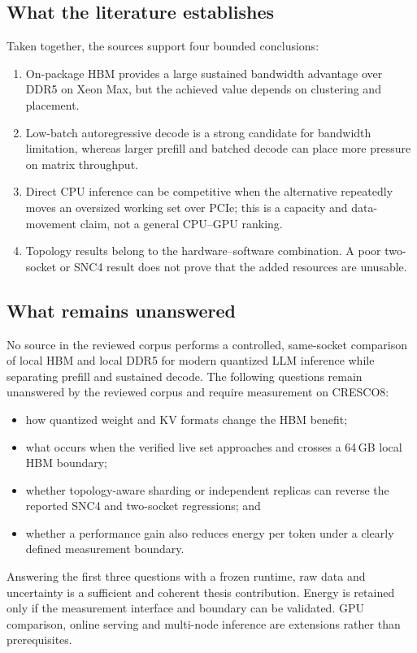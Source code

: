 \subsection{What the literature establishes}

Taken together, the sources support four bounded conclusions:

\begin{enumerate}
  \item On-package HBM provides a large sustained bandwidth advantage
        over DDR5 on Xeon Max, but the achieved value depends on
        clustering and placement.
  \item Low-batch autoregressive decode is a strong candidate for
        bandwidth limitation, whereas larger prefill and batched decode
        can place more pressure on matrix throughput.
  \item Direct CPU inference can be competitive when the alternative
        repeatedly moves an oversized working set over PCIe; this is a
        capacity and data-movement claim, not a general CPU--GPU ranking.
  \item Topology results belong to the hardware--software combination.
        A poor two-socket or SNC4 result does not prove that the added
        resources are unusable.
\end{enumerate}

\subsection{What remains unanswered}
\label{sec:research-gap}

No source in the reviewed corpus performs a controlled, same-socket
comparison of local HBM and local DDR5 for modern quantized LLM
inference while separating prefill and sustained decode.  The following
questions remain unanswered by the reviewed corpus and require
measurement on CRESCO8:

\begin{itemize}
  \item how quantized weight and KV formats change the HBM benefit;
  \item what occurs when the verified live set approaches and crosses a
        64\,GB local HBM boundary;
  \item whether topology-aware sharding or independent replicas can
        reverse the reported SNC4 and two-socket regressions; and
  \item whether a performance gain also reduces energy per token under a
        clearly defined measurement boundary.
\end{itemize}

Answering the first three questions with a frozen runtime, raw data and
uncertainty is a sufficient and coherent thesis contribution.  Energy
is retained only if the measurement interface and boundary can be
validated.  GPU comparison, online serving and multi-node inference are
extensions rather than prerequisites.
